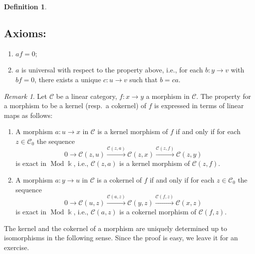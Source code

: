 \documentclass{surv-l}
\numberwithin{equation}{chapter}
\numberwithin{figure}{chapter}
\theoremstyle{plain}
\theoremstyle{definition}
\newtheorem{dfn}[thm]{Definition}
\theoremstyle{remark}
\newtheorem{rmk}[thm]{Remark}
\DeclareMathOperator{\Mod}{Mod}
\begin{document}
\begin{dfn}
\begin{enumerate}
\subsection*{Axioms:}
\begin{enumerate}
\item
$af = 0$;
\item
$a$ is universal with respect to the property above, i.e.,
for each $b \colon y \to v$ with $bf = 0$, there exists a unique $c \colon u \to v$
such that $b = ca$.
\end{enumerate}
\end{enumerate}
\end{dfn}

\begin{rmk}\label{rmk:Hom-left-exact}
Let ${\mathcal{C}}$ be a linear category, $f \colon x \to y$ a morphism in ${\mathcal{C}}$.
The property for a morphism to be a kernel (resp.\ a cokernel) of $f$ is expressed in terms of linear maps as follows:
\begin{enumerate}
\item
A morphism $a \colon u \to x$ in ${\mathcal{C}}$ is a kernel morphism of $f$
if and only if
for each $z \in {\mathcal{C}}_0$ the sequence
\[
0 \to {\mathcal{C}}(z, u) \xrightarrow{{\mathcal{C}}(z, a)} {\mathcal{C}}(z, x) \xrightarrow{{\mathcal{C}}(z, f)} {\mathcal{C}}(z, y)
\]
is exact in $\Mod\Bbbk$, i.e.,
${\mathcal{C}}(z,a)$ is a kernel morphism of ${\mathcal{C}}(z, f)$.
\item
A morphism $a \colon y \to u$ in ${\mathcal{C}}$ is a cokernel of $f$
if and only if
for each $z \in {\mathcal{C}}_0$ the sequence
\[
0 \to {\mathcal{C}}(u, z) \xrightarrow{{\mathcal{C}}(a, z)} {\mathcal{C}}(y, z) \xrightarrow{{\mathcal{C}}(f, z)} {\mathcal{C}}(x, z)
\]
is exact in $\Mod\Bbbk$, i.e.,
${\mathcal{C}}(a, z)$ is a cokernel morphism of ${\mathcal{C}}(f, z)$.
\end{enumerate}
\end{rmk}

The kernel and the cokernel of a morphism are uniquely determined
up to isomorphisms in the following sense.
Since the proof is easy, we leave it for an exercise.
\end{document}
